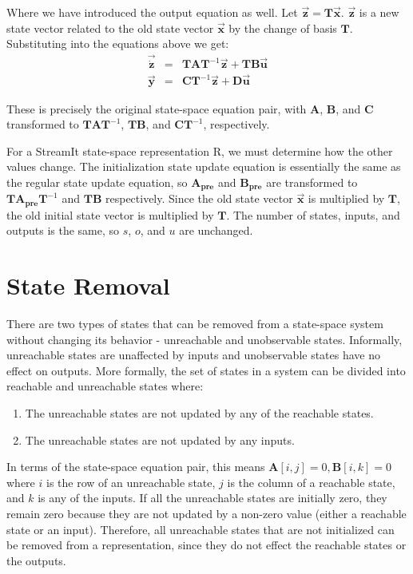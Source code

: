     Where we have introduced the output equation as well. Let
$\vec{\mathbf{z}} = \mathbf{T} \vec{\mathbf{x}}$.
$\vec{\mathbf{z}}$ is a new state vector related to the old state
vector $\vec{\mathbf{x}}$ by the change of basis $\mathbf{T}$.
Substituting into the equations above we get:
\begin{eqnarray*}
\vec{\dot{\mathbf{z}}} & = & \mathbf{TA} \mathbf{T}^{-1} \vec{\mathbf{z}} + \mathbf{TB} \vec{\mathbf{u}} \\
\vec{\mathbf{y}} & = & \mathbf{C} \mathbf{T}^{-1}\vec{\mathbf{z}}
+ \mathbf{D}\vec{\mathbf{u}}
\end{eqnarray*}

    These is precisely the original state-space equation pair,
with $\mathbf{A}$, $\mathbf{B}$, and $\mathbf{C}$ transformed to
$\mathbf{T} \mathbf{A} \mathbf{T}^{-1}$, $\mathbf{T} \mathbf{B}$,
and $\mathbf{C} \mathbf{T}^{-1}$, respectively.

    For a StreamIt state-space representation $\mathrm{R}$, we must
determine how the other values change. The initialization state
update equation is essentially the same as the regular state
update equation, so $\mathbf{A_{pre}}$ and $\mathbf{B_{pre}}$ are
transformed to $\mathbf{T} \mathbf{A_{pre}} \mathbf{T}^{-1}$ and
$\mathbf{T} \mathbf{B}$ respectively. Since the old state vector
$\vec{\mathbf{x}}$ is multiplied by $\mathbf{T}$, the old initial
state vector is multiplied by $\mathbf{T}$. The number of states,
inputs, and outputs is the same, so $s$, $o$, and $u$ are
unchanged.

\section{State Removal}

    There are two types of states that can be removed from a state-space system
without changing its behavior - unreachable and unobservable
states. Informally, unreachable states are unaffected by inputs
and unobservable states have no effect on outputs. More formally,
the set of states in a system can be divided into reachable and
unreachable states where:
\begin{enumerate}
\item The unreachable states are not updated by any of the
reachable states.

\item The unreachable states are not updated by any inputs.
\end{enumerate}

    In terms of the state-space equation pair, this means $\mathbf{A}[i,j] =
0, \mathbf{B}[i,k] = 0$ where $i$ is the row of an unreachable
state, $j$ is the column of a reachable state, and $k$ is any of
the inputs.
    If all the unreachable states are initially zero, they
remain zero because they are not updated by a non-zero value
(either a reachable state or an input). Therefore, all unreachable
states that are not initialized can be removed from a
representation, since they do not effect the reachable states or
the outputs.

